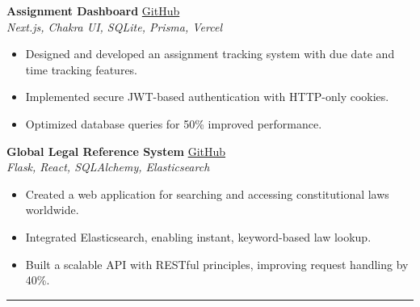 \documentclass[a4paper,10pt]{article}
\begin{document}
\textbf{Assignment Dashboard} \hfill \href{https://github.com/znafi/Assignment-Tracker.git}{GitHub} \\
\textit{Next.js, Chakra UI, SQLite, Prisma, Vercel}
\begin{itemize}[leftmargin=*]
    \item Designed and developed an assignment tracking system with due date and time tracking features.
    \item Implemented secure JWT-based authentication with HTTP-only cookies.
    \item Optimized database queries for 50\% improved performance.
\end{itemize}

\textbf{Global Legal Reference System} \hfill \href{https://github.com/znafi/Lawyer.git}{GitHub} \\
\textit{Flask, React, SQLAlchemy, Elasticsearch}
\begin{itemize}[leftmargin=*]
    \item Created a web application for searching and accessing constitutional laws worldwide.
    \item Integrated Elasticsearch, enabling instant, keyword-based law lookup.
    \item Built a scalable API with RESTful principles, improving request handling by 40\%.
\end{itemize}

\vspace{6pt}
\hrule \vspace{6pt}
\end{document}
